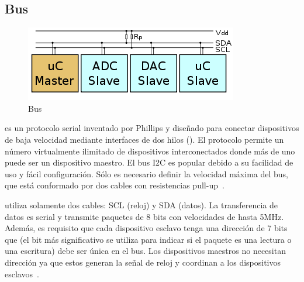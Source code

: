 %
%


\subsection{Bus \IIC}%
\label{sec:intro-i2c}

\begin{figure}
	\centering
	\includegraphics[width=0.3\columnwidth]{img/i2c-bus.png}
	\caption{Bus \IIC}%
	\label{fig:iic-bus}
\end{figure}
\IIC{} es un protocolo serial inventado por Phillips y diseñado para conectar dispositivos de baja velocidad mediante interfaces de dos hilos ().
El protocolo permite un número virtualmente ilimitado de dispositivos interconectados donde más de uno puede ser un dispositivo maestro.
El bus I2C es popular debido a su facilidad de uso y fácil configuración.
Sólo es necesario definir la velocidad máxima del bus, que está conformado por dos cables con resistencias pull-up~.

\IIC{} utiliza solamente dos cables: SCL (reloj) y SDA (datos).
La transferencia de datos es serial y transmite paquetes de 8 bits con velocidades de hasta 5MHz.
Además, es requisito que cada dispositivo esclavo tenga una dirección de 7 bits que (el bit más significativo se utiliza para indicar si el paquete es una lectura o una escritura) debe ser única en el bus.
Los dispositivos maestros no necesitan dirección ya que estos generan la señal de reloj y coordinan a los dispositivos esclavos~.
